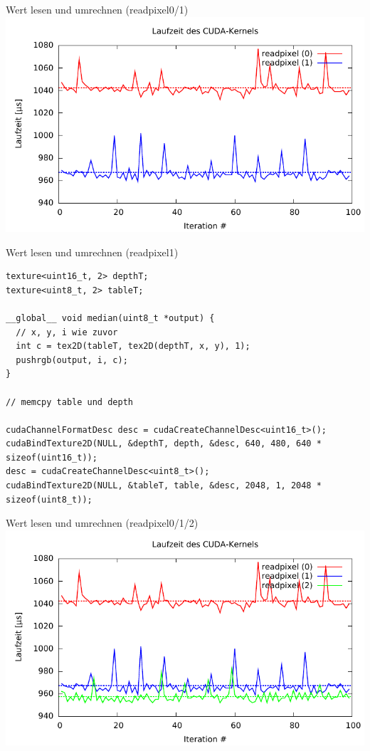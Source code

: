 \documentclass[compress]{beamer}
\begin{document}
\begin{frame}[fragile]{Wert lesen und umrechnen (readpixel0/1)}
\includegraphics[width=\textwidth]{readpixel01.pdf}
\end{frame}

\begin{frame}[fragile]{Wert lesen und umrechnen (readpixel1)}
\begin{lstlisting}
texture<uint16_t, 2> depthT;
texture<uint8_t, 2> tableT;

__global__ void median(uint8_t *output) {
  // x, y, i wie zuvor
  int c = tex2D(tableT, tex2D(depthT, x, y), 1);
  pushrgb(output, i, c);
}

// memcpy table und depth

cudaChannelFormatDesc desc = cudaCreateChannelDesc<uint16_t>();
cudaBindTexture2D(NULL, &depthT, depth, &desc, 640, 480, 640 * sizeof(uint16_t));
desc = cudaCreateChannelDesc<uint8_t>();
cudaBindTexture2D(NULL, &tableT, table, &desc, 2048, 1, 2048 * sizeof(uint8_t));
\end{lstlisting}
\end{frame}

\begin{frame}[fragile]{Wert lesen und umrechnen (readpixel0/1/2)}
\includegraphics[width=\textwidth]{readpixel12.pdf}
\end{frame}
\end{document}
